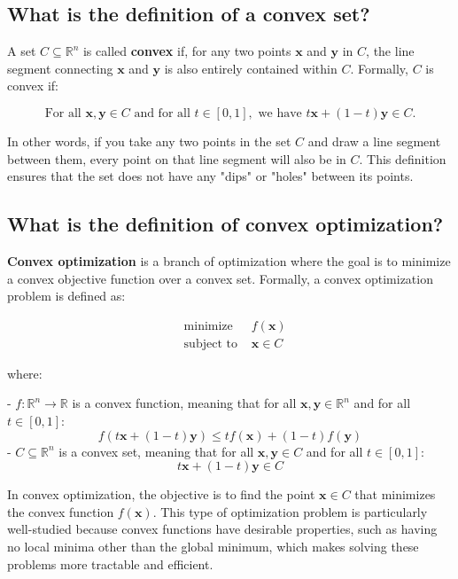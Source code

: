 \subsection{What is the definition of a convex set?}
A set $C \subseteq \mathbb{R}^n$ is called \textbf{convex} if, for any two points $\mathbf{x}$ and $\mathbf{y}$ in $C$, the line segment connecting $\mathbf{x}$ and $\mathbf{y}$ is also entirely contained within $C$. Formally, $C$ is convex if:

\[
\text{For all } \mathbf{x}, \mathbf{y} \in C \text{ and for all } t \in [0, 1], \text{ we have } t \mathbf{x} + (1 - t) \mathbf{y} \in C.
\]

In other words, if you take any two points in the set $C$ and draw a line segment between them, every point on that line segment will also be in $C$. This definition ensures that the set does not have any "dips" or "holes" between its points.


\subsection{What is the definition of convex optimization?}
\textbf{Convex optimization} is a branch of optimization where the goal is to minimize a convex objective function over a convex set. Formally, a convex optimization problem is defined as:

\[
\begin{aligned}
& \text{minimize } & f(\mathbf{x}) \\
& \text{subject to } & \mathbf{x} \in C
\end{aligned}
\]

where:

- $f: \mathbb{R}^n \to \mathbb{R}$ is a convex function, meaning that for all $\mathbf{x}, \mathbf{y} \in \mathbb{R}^n$ and for all $t \in [0, 1]$:
  \[
  f(t \mathbf{x} + (1 - t) \mathbf{y}) \leq t f(\mathbf{x}) + (1 - t) f(\mathbf{y})
  \]
- $C \subseteq \mathbb{R}^n$ is a convex set, meaning that for all $\mathbf{x}, \mathbf{y} \in C$ and for all $t \in [0, 1]$:
  \[
  t \mathbf{x} + (1 - t) \mathbf{y} \in C
  \]

In convex optimization, the objective is to find the point $\mathbf{x} \in C$ that minimizes the convex function $f(\mathbf{x})$. This type of optimization problem is particularly well-studied because convex functions have desirable properties, such as having no local minima other than the global minimum, which makes solving these problems more tractable and efficient.

